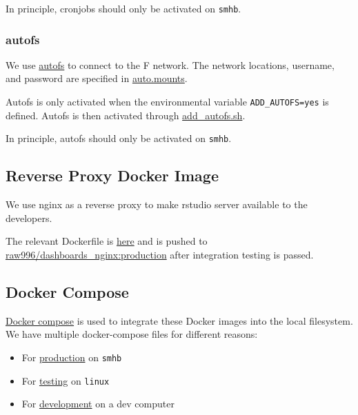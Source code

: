 \documentclass[12pt,]{article}
\providecommand{\tightlist}{%
  \setlength{\itemsep}{0pt}\setlength{\parskip}{0pt}}
\begin{document}
In principle, cronjobs should only be activated on \texttt{smhb}.

\hypertarget{autofs}{\subsubsection{autofs}\label{autofs}}

We use \href{https://help.ubuntu.com/community/Autofs}{autofs} to
connect to the F network. The network locations, username, and password
are specified in
\href{https://github.com/raubreywhite/dashboards_control/blob/master/infrastructure/dashboards_r/auto.mounts}{auto.mounts}.

Autofs is only activated when the environmental variable
\texttt{ADD\_AUTOFS=yes} is defined. Autofs is then activated through
\href{https://github.com/raubreywhite/dashboards_control/blob/master/infrastructure/dashboards_r/add_autofs.sh}{add\_autofs.sh}.

In principle, autofs should only be activated on \texttt{smhb}.

\subsection{Reverse Proxy Docker
Image}\label{reverse-proxy-docker-image}

We use nginx as a reverse proxy to make rstudio server available to the
developers.

The relevant Dockerfile is
\href{https://github.com/raubreywhite/dashboards_control/blob/master/infrastructure/dashboards_nginx/Dockerfile}{here}
and is pushed to
\href{https://hub.docker.com/r/raw996/dashboards_nginx/}{raw996/dashboards\_nginx:production}
after integration testing is passed.

\hypertarget{dockercompose}{\subsection{Docker
Compose}\label{dockercompose}}

\href{https://docs.docker.com/compose/}{Docker compose} is used to
integrate these Docker images into the local filesystem. We have
multiple docker-compose files for different reasons:

\begin{itemize}
\tightlist
\item
  For
  \href{https://github.com/raubreywhite/dashboards_control/blob/master/infrastructure/docker-compose-prod.yml}{production}
  on \texttt{smhb}
\item
  For
  \href{https://github.com/raubreywhite/dashboards_control/blob/master/infrastructure/docker-compose-test.yml}{testing}
  on \texttt{linux}
\item
  For
  \href{https://github.com/raubreywhite/dashboards_control/blob/master/infrastructure/docker-compose-dev.yml}{development}
  on a dev computer
\end{itemize}
\end{document}
